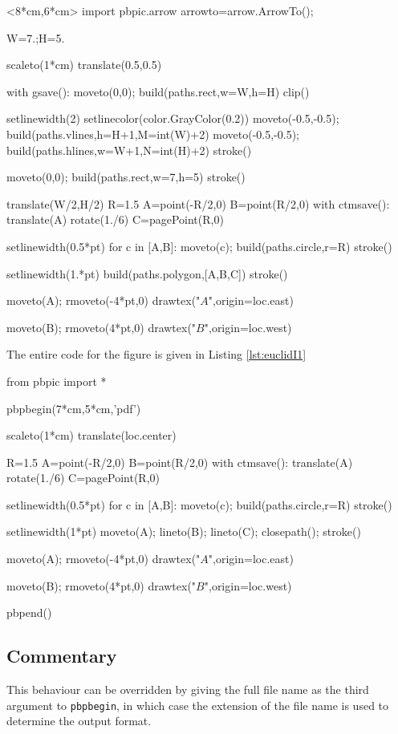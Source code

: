 \documentclass[12pt]{article}
\def\code#1{{\tt #1}}
\begin{document}
\hfil\begin{pbpic}<8*cm,6*cm>
import pbpic.arrow
arrowto=arrow.ArrowTo();

W=7.;H=5.

scaleto(1*cm)
translate(0.5,0.5)

with gsave():
  moveto(0,0); build(paths.rect,w=W,h=H)
  clip()
  
  setlinewidth(2)
  setlinecolor(color.GrayColor(0.2))
  moveto(-0.5,-0.5); build(paths.vlines,h=H+1,M=int(W)+2)
  moveto(-0.5,-0.5); build(paths.hlines,w=W+1,N=int(H)+2)
  stroke()

moveto(0,0); build(paths.rect,w=7,h=5)
stroke()

translate(W/2,H/2)
R=1.5
A=point(-R/2,0)
B=point(R/2,0)
with ctmsave():
  translate(A)
  rotate(1./6)
  C=pagePoint(R,0)

setlinewidth(0.5*pt)
for c in [A,B]:
  moveto(c);
  build(paths.circle,r=R)
  stroke()
  
setlinewidth(1.*pt)
build(paths.polygon,[A,B,C])
stroke()

moveto(A); rmoveto(-4*pt,0)
drawtex("$A$",origin=loc.east)

moveto(B); rmoveto(4*pt,0)
drawtex("$B$",origin=loc.west)
\end{pbpic}

The entire code for the figure is given in Listing \ref{lst:euclidI1}
\begin{snippet}
from pbpic import *

pbpbegin(7*cm,5*cm,'pdf')

scaleto(1*cm)
translate(loc.center)

R=1.5
A=point(-R/2,0)
B=point(R/2,0)
with ctmsave():
  translate(A)
  rotate(1./6)
  C=pagePoint(R,0)

setlinewidth(0.5*pt)
for c in [A,B]:
  moveto(c); build(paths.circle,r=R)
  stroke()

setlinewidth(1*pt)
moveto(A); lineto(B); lineto(C); closepath();
stroke()

moveto(A); rmoveto(-4*pt,0)
drawtex("$A$",origin=loc.east)

moveto(B); rmoveto(4*pt,0)
drawtex("$B$",origin=loc.west)

pbpend()
\end{snippet}

\subsection{Commentary}

This behaviour can be overridden by giving the full file name as the third argument to \code{pbpbegin}, in which case the extension of the 
file name is used
to determine the output format.
\end{document}
